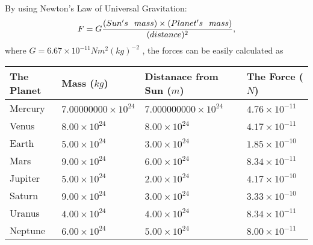 \documentclass[12pt]{article}
\begin{document}
 
 
 
\noindent{}
 
 

By using Newton's Law of Universal Gravitation:
\[
F=G \frac{(Sun's \hspace{0.1in} mass) \times (Planet's \hspace{0.1in} mass)} { (distance)^2},
\]
where
$ G= %
6.67 \times 10^{-11}N m^{2}(kg)^{-2}$ , the forces can be easily calculated as
 
\vspace{0.2in}
 
 
\begin{tabular}{|l|l|l|l|}
\hline
The Planet & Mass ($kg$) & Distanace from Sun ($m$) & The Force ($N$)\\
\hline
Mercury  &
           $ %
7.00000000 \times 10^{24} $   &
             $ %
7.000000000 \times 10^{24} $    & $ %
4.76 \times 10^{-11} $
\\  \hline
Venus    &
           $  %
8.00 \times 10^{24}  $     &
             $ %
8.00 \times 10^{24} $    & $ %
4.17 \times 10^{-11} $
\\  \hline
Earth    &
           $  %
5.00 \times 10^{24}  $     &
             $ %
3.00 \times 10^{24} $    & $ %
1.85 \times 10^{-10} $
\\   \hline
Mars     &
           $  %
9.00 \times 10^{24} $     &
             $ %
6.00 \times 10^{24} $    & $ %
8.34 \times 10^{-11} $
\\   \hline
Jupiter  &
           $  %
5.00 \times 10^{24} $    &
             $ %
2.00 \times 10^{24} $    & $ %
4.17 \times 10^{-10} $
\\  \hline
Saturn   &
           $  %
9.00 \times 10^{24} $    &
             $ %
3.00 \times 10^{24}  $    & $ %
3.33 \times 10^{-10} $
\\  \hline
Uranus   &
           $  %
4.00 \times 10^{24} $    &
             $ %
4.00 \times 10^{24} $    & $ %
8.34 \times 10^{-11} $
\\  \hline
Neptune  &
           $  %
6.00 \times 10^{24} $    &
             $ %
5.00 \times 10^{24} $    & $ %
8.00 \times 10^{-11} $
\\  \hline
 
\end{tabular}
 
 
 
 
\noindent{}
 
\end{document}
